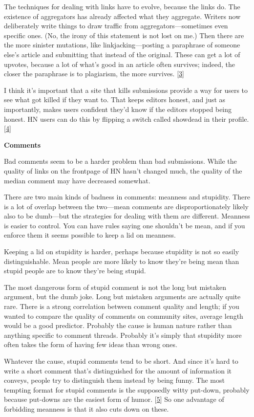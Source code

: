 The techniques for dealing with links have to evolve, because the links
do. The existence of aggregators has already affected what they
aggregate. Writers now deliberately write things to draw traffic from
aggregators---sometimes even specific ones. (No, the irony of this
statement is not lost on me.) Then there are the more sinister
mutations, like linkjacking---posting a paraphrase of someone else's
article and submitting that instead of the original. These can get a lot
of upvotes, because a lot of what's good in an article often survives;
indeed, the closer the paraphrase is to plagiarism, the more survives.
{[}\hyperref[f3n]{3}{]}

I think it's important that a site that kills submissions provide a way
for users to see what got killed if they want to. That keeps editors
honest, and just as importantly, makes users confident they'd know if
the editors stopped being honest. HN users can do this by flipping a
switch called showdead in their profile. {[}\hyperref[f4n]{4}{]}

\textbf{Comments}

Bad comments seem to be a harder problem than bad submissions. While the
quality of links on the frontpage of HN hasn't changed much, the quality
of the median comment may have decreased somewhat.

There are two main kinds of badness in comments: meanness and stupidity.
There is a lot of overlap between the two---mean comments are
disproportionately likely also to be dumb---but the strategies for
dealing with them are different. Meanness is easier to control. You can
have rules saying one shouldn't be mean, and if you enforce them it
seems possible to keep a lid on meanness.

Keeping a lid on stupidity is harder, perhaps because stupidity is not
so easily distinguishable. Mean people are more likely to know they're
being mean than stupid people are to know they're being stupid.

The most dangerous form of stupid comment is not the long but mistaken
argument, but the dumb joke. Long but mistaken arguments are actually
quite rare. There is a strong correlation between comment quality and
length; if you wanted to compare the quality of comments on community
sites, average length would be a good predictor. Probably the cause is
human nature rather than anything specific to comment threads. Probably
it's simply that stupidity more often takes the form of having few ideas
than wrong ones.

Whatever the cause, stupid comments tend to be short. And since it's
hard to write a short comment that's distinguished for the amount of
information it conveys, people try to distinguish them instead by being
funny. The most tempting format for stupid comments is the supposedly
witty put-down, probably because put-downs are the easiest form of
humor. {[}\hyperref[f5n]{5}{]} So one advantage of forbidding meanness
is that it also cuts down on these.

